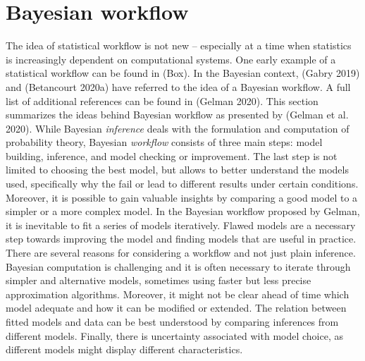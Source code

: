 \section{Bayesian workflow}

The idea of statistical workflow is not new – especially at a time when statistics is increasingly dependent on computational systems. One early example of a statistical workflow can be found in (Box).
In the Bayesian context, (Gabry 2019) and (Betancourt 2020a) have referred to the idea of a Bayesian workflow.
A full list of additional references can be found in (Gelman 2020).
This section summarizes the ideas behind Bayesian workflow as presented by (Gelman et al. 2020).
While Bayesian \textit{inference} deals with the formulation and computation of probability theory, Bayesian \textit{workflow} consists of three main steps: model building, inference, and model checking or improvement.
The last step is not limited to choosing the best model, but allows to better understand the models used, specifically why the fail or lead to different results under certain conditions.
Moreover, it is possible to gain valuable insights by comparing a good model to a simpler or a more complex model.
In the Bayesian workflow proposed by Gelman, it is inevitable to fit a series of models iteratively.
Flawed models are a necessary step towards improving the model and finding models that are useful in practice.
There are several reasons for considering a workflow and not just plain inference.
Bayesian computation is challenging and it is often necessary to iterate through simpler and alternative models, sometimes using faster but less precise approximation algorithms.
Moreover, it might not be clear ahead of time which model adequate and how it can be modified or extended.
The relation between fitted models and data can be best understood by comparing inferences from different models.
Finally, there is uncertainty associated with model choice, as different models might display different characteristics.


